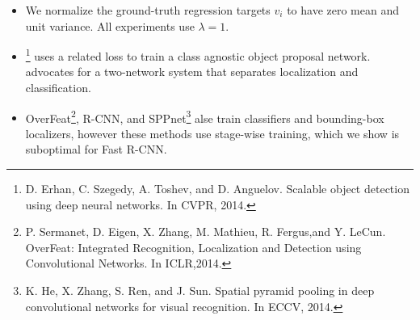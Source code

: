 \documentclass[11pt]{article}
\begin{document}
\begin{itemize}
\begin{itemize}
\begin{equation}
         smooth_{L_1}(x) = 
       \begin{cases}
       {0.5x^2} &\mbox{if |x| < 1}\\
       {|x| - 0.5} &\mbox{otherwise}
       \end{cases}
       \end{equation}
       is a robust $L_1$ loss that is less sensitive to outliers than the $L_2$ loss used in 
       R-CNN and SPPnet.
\begin{itemize}
\item When the regression targets are unbounded, training with $L_2$ loss can require careful
         tuning of learning rates in order to prevent exploding gradients. Eq.3 eliminates this
         sensitivity.
\end{itemize}
\item We normalize the ground-truth regression targets $v_i$ to have zero mean and unit variance.
       All experiments use $\lambda = 1$.
\item \footnote{D. Erhan, C. Szegedy, A. Toshev, and D. Anguelov. 
Scalable object detection using deep neural networks. In CVPR, 2014.
 } uses a related loss to train a class agnostic object proposal network. \footnotemark[2] advocates
       for a two-network system that separates localization and classification.
\item OverFeat\footnote{P. Sermanet,  D. Eigen,  X. Zhang,  M. Mathieu,  R. Fergus,and Y. LeCun.  
OverFeat: Integrated Recognition, Localization and Detection using Convolutional Networks.  
In ICLR,2014.
 }, R-CNN\footnotemark[1], and SPPnet\footnote{K. He, X. Zhang, S. Ren, and J. Sun. 
Spatial pyramid pooling in  deep  convolutional  networks  for  visual  recognition.   
In ECCV, 2014.
 } alse train classifiers and bounding-box 
       localizers, however these methods use stage-wise training, which we show is suboptimal
       for Fast R-CNN.
\end{itemize}



\end{itemize}
\end{document}
